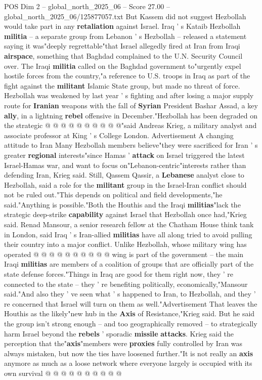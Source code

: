 \begin{textsample}{POS Dim 2 – global\_north\_2025\_06 – Score 27.00 – global\_north\_2025\_06/125877057.txt}
But Kassem did not suggest Hezbollah would take part in any \textbf{retaliation} against Israel.
Iraq ' s Kataib Hezbollah \textbf{militia} -- a separate group from Lebanon ' s Hezbollah -- released a statement saying it was"deeply regrettable"that Israel allegedly fired at Iran from Iraqi \textbf{airspace}, something that Baghdad complained to the U.N.
Security Council over.
The Iraqi \textbf{militia} called on the Baghdad government to"urgently expel hostile forces from the country,"a reference to U.S. troops in Iraq as part of the fight against the \textbf{militant} Islamic State group, but made no threat of force.
Hezbollah was weakened by last year ' s fighting and after losing a major supply route for \textbf{Iranian} weapons with the fall of \textbf{Syrian} President Bashar Assad, a key \textbf{ally}, in a lightning \textbf{rebel} offensive in December."Hezbollah has been degraded on the strategic @ @ @ @ @ @ @ @ @ @"said Andreas Krieg, a military analyst and associate professor at King ' s College London.
Advertisement A changing attitude to Iran Many Hezbollah members believe"they were sacrificed for Iran ' s greater \textbf{regional} interests"since Hamas ' \textbf{attack} on Israel triggered the latest Israel-Hamas war, and want to focus on"Lebanon-centric"interests rather than defending Iran, Krieg said.
Still, Qassem Qassir, a \textbf{Lebanese} analyst close to Hezbollah, said a role for the \textbf{militant} group in the Israel-Iran conflict should not be ruled out."This depends on political and field developments,"he said."Anything is possible."Both the Houthis and the Iraqi \textbf{militias}"lack the strategic deep-strike \textbf{capability} against Israel that Hezbollah once had,"Krieg said.
Renad Mansour, a senior research fellow at the Chatham House think tank in London, said Iraq ' s Iran-allied \textbf{militias} have all along tried to avoid pulling their country into a major conflict.
Unlike Hezbollah, whose military wing has operated @ @ @ @ @ @ @ @ @ @ wing is part of the government -- the main Iraqi \textbf{militias} are members of a coalition of groups that are officially part of the state defense forces."Things in Iraq are good for them right now, they ' re connected to the state -- they ' re benefiting politically, economically,"Mansour said."And also they ' ve seen what ' s happened to Iran, to Hezbollah, and they ' re concerned that Israel will turn on them as well."Advertisement That leaves the Houthis as the likely"new hub in the \textbf{Axis} of Resistance,"Krieg said.
But he said the group isn't strong enough -- and too geographically removed -- to strategically harm Israel beyond the \textbf{rebels} ' sporadic \textbf{missile} \textbf{attacks}.
Krieg said the perception that the"\textbf{axis}"members were \textbf{proxies} fully controlled by Iran was always mistaken, but now the ties have loosened further."It is not really an \textbf{axis} anymore as much as a loose network where everyone largely is occupied with its own survival @ @ @ @ @ @ @ @ @ @


\end{textsample}

